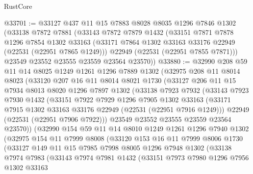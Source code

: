 \begin{lexlean}{RustCore}
\begin{coremodule}
@33701 := @33127
    @437
    @11
    @15
    @7883
    @8028
    @8035
    @1296
    @7846
    @1302
    (@33138
      @7872
      @7881
      (@33143
        @7872
        @7879
        @1432
        (@33151
          @7871
          @7878
          @1296
          @7854
          @1302
          @33163
          (@33171 @7864 @1302 @33163 @33176 @22949 (@22531 (@22951 @7865 @1249)))
          @22949
          (@22531 (@22951 @7855 @7871)))
        @23549
        @23552
        @23555
        @23559
        @23564
        @23570))
@33880 := @32990
    @208
    @59
    @11
    @14
    @8025
    @1249
    @1261
    @1296
    @7889
    @1302
    (@32975
      @208
      @11
      @8014
      @8023
      (@33120
        @207
        @16
        @11
        @8014
        @8021
        @1730
        (@33127
          @206
          @11
          @15
          @7934
          @8013
          @8020
          @1296
          @7897
          @1302
          (@33138
            @7923
            @7932
            (@33143
              @7923
              @7930
              @1432
              (@33151
                @7922
                @7929
                @1296
                @7905
                @1302
                @33163
                (@33171 @7915 @1302 @33163 @33176 @22949 (@22531 (@22951 @7916 @1249)))
                @22949
                (@22531 (@22951 @7906 @7922)))
              @23549
              @23552
              @23555
              @23559
              @23564
              @23570))
          (@32990
            @154
            @59
            @11
            @14
            @8010
            @1249
            @1261
            @1296
            @7940
            @1302
            (@32975
              @154
              @11
              @7999
              @8008
              (@33120
                @153
                @16
                @11
                @7999
                @8006
                @1730
                (@33127
                  @149
                  @11
                  @15
                  @7985
                  @7998
                  @8005
                  @1296
                  @7948
                  @1302
                  (@33138
                    @7974
                    @7983
                    (@33143
                      @7974
                      @7981
                      @1432
                      (@33151
                        @7973
                        @7980
                        @1296
                        @7956
                        @1302
                        @33163

\end{coremodule}
\end{lexlean}
